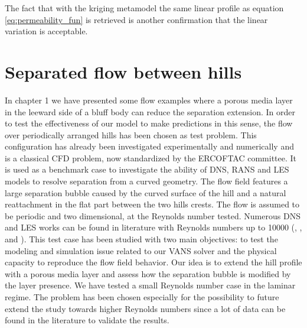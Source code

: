 The fact that with the kriging metamodel the same linear profile as equation \ref{eq:permeability_fun} is retrieved is another confirmation that the linear variation is acceptable.


\section{Separated flow between hills}
In chapter 1 we have presented some flow examples where a porous media layer in the leeward side of a bluff body can reduce the separation extension. In order to test the effectiveness of our model to make predictions in this sense, the flow over periodically arranged hills has been chosen as test problem. This configuration has already been investigated experimentally and numerically and is a classical CFD problem, now standardized by the ERCOFTAC committee.
It is used as a benchmark case to investigate the ability of DNS, RANS and LES models to resolve separation from a curved geometry.
The flow field features a large separation bubble caused by the curved surface of the hill and a natural reattachment in the flat part between the two hills crests. 
The flow is assumed to be periodic and two dimensional, at the Reynolds number tested. Numerous DNS and LES works can be found in literature with Reynolds numbers up to 10000 (\citet{chang2014simulations}, \citet{breuer2005issues} \cite{breuer2009flow}, \citet{almeida1993wake} and \citet{temmerman2001large}).
This test case has been studied with two main objectives: to test the modeling and simulation issue related to our VANS solver and the physical capacity to reproduce the flow field behavior. 
Our idea is to extend the hill profile with a porous media layer and assess how the separation bubble is modified by the layer presence.
We have tested a small Reynolds number case in the laminar regime. The problem has been chosen especially for the possibility to future extend the study towards higher Reynolds numbers since a lot of data can be found in the literature to validate the results.

